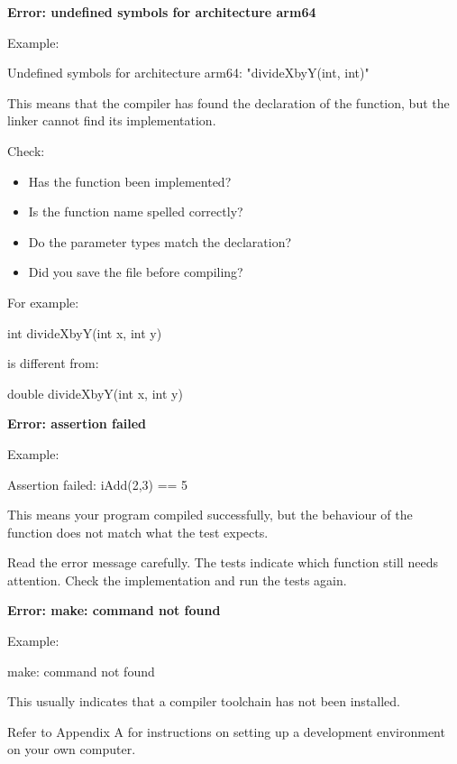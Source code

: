 \documentclass{csc2059practical}
\begin{document}
\begin{commonerror}
\textbf{Error: undefined symbols for architecture arm64}

Example:

\begin{terminal}
Undefined symbols for architecture arm64:
"divideXbyY(int, int)"
\end{terminal}

This means that the compiler has found the declaration of the function, but the linker cannot find its implementation.

Check:

\begin{itemize}
  \item Has the function been implemented?
  \item Is the function name spelled correctly?
  \item Do the parameter types match the declaration?
  \item Did you save the file before compiling?
\end{itemize}

For example:

\begin{cppcode}
int divideXbyY(int x, int y)
\end{cppcode}

is different from:

\begin{cppcode}
double divideXbyY(int x, int y)
\end{cppcode}
\end{commonerror}

\begin{commonerror}
\textbf{Error: assertion failed}

Example:

\begin{terminal}
Assertion failed:
iAdd(2,3) == 5
\end{terminal}

This means your program compiled successfully, but the behaviour of the function does not match what the test expects.

Read the error message carefully. The tests indicate which function still needs attention. Check the implementation and run the tests again.
\end{commonerror}

\begin{commonerror}
\textbf{Error: make: command not found}

Example:

\begin{terminal}
make: command not found
\end{terminal}

This usually indicates that a compiler toolchain has not been installed.

Refer to Appendix A for instructions on setting up a development environment on your own computer.
\end{commonerror}
\end{document}

